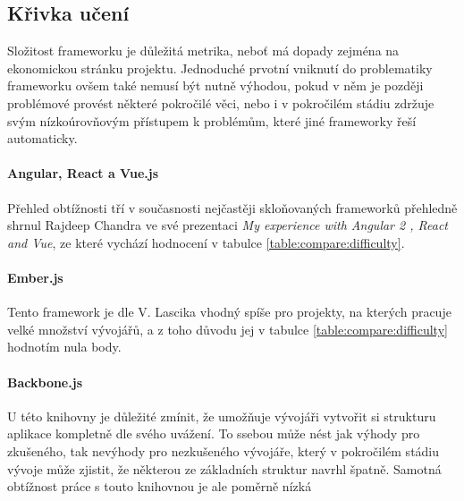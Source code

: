 
\subsection{Křivka učení}

Složitost frameworku je důležitá metrika, neboť má dopady zejména na ekonomickou stránku projektu. Jednoduché prvotní vniknutí do problematiky frameworku ovšem také nemusí být nutně výhodou, pokud v něm je později problémové provést některé pokročilé věci, nebo i v pokročilém stádiu zdržuje svým nízkoúrovňovým přístupem k problémům, které jiné frameworky řeší automaticky.

\paragraph{Angular, React a Vue.js} Přehled obtížnosti tří v současnosti nejčastěji skloňovaných frameworků přehledně shrnul Rajdeep Chandra ve své prezentaci \emph{My experience with Angular 2 , React and Vue}\cite{frameworks-3compare}, ze které vychází hodnocení v tabulce \ref{table:compare:difficulty}.

\paragraph{Ember.js} Tento framework je dle V. Lascika\cite{ember-diffuculty} vhodný spíše pro projekty, na kterých pracuje velké množství vývojářů, a z toho důvodu jej v tabulce \ref{table:compare:difficulty} hodnotím nula body.

\paragraph{Backbone.js} U této knihovny je důležité zmínit, že umožňuje vývojáři vytvořit si strukturu aplikace kompletně dle svého uvážení\cite{frameworks-rubygarage}. To ssebou může nést jak výhody pro zkušeného, tak nevýhody pro nezkušeného vývojáře, který v pokročilém stádiu vývoje může zjistit, že některou ze základních struktur navrhl špatně. Samotná obtížnost práce s touto knihovnou je ale poměrně nízká

